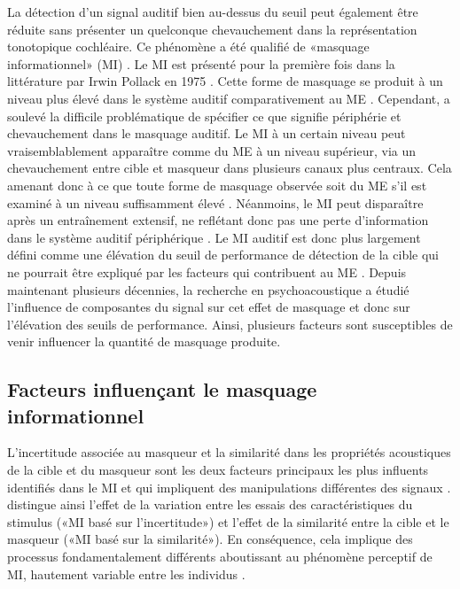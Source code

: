 La détection d'un signal auditif bien au-dessus du seuil peut également être réduite sans présenter un quelconque chevauchement dans la représentation tonotopique cochléaire. 
Ce phénomène a été qualifié de «masquage informationnel» (MI) \citep{durlach2003note, kidd2008informationalreview, pollack1975auditory, watson1976factors}. 
Le MI est présenté pour la première fois dans la littérature par Irwin Pollack en 1975 \citep{pollack1975auditory}. 
Cette forme de masquage se produit à un niveau plus élevé dans le système auditif comparativement au ME \citep{lutfi1989informational, leek1991informational, pollack1975auditory, watson1981role}. 
Cependant, \cite{durlach2006auditory} a soulevé la difficile problématique de spécifier ce que signifie périphérie et chevauchement dans le masquage auditif.
Le MI à un certain niveau peut vraisemblablement apparaître comme du ME à un niveau supérieur, via un chevauchement entre cible et masqueur dans plusieurs canaux plus centraux. 
Cela amenant donc à ce que toute forme de masquage observée soit du ME s'il est examiné à un niveau suffisamment élevé \citep{durlach2006auditory}. 
Néanmoins, le MI peut disparaître après un entraînement extensif, ne reflétant donc pas une perte d'information dans le système auditif périphérique \citep{oxenham2003informational}.
Le MI auditif est donc plus largement défini comme une élévation du seuil de performance de détection de la cible qui ne pourrait être expliqué par les facteurs qui contribuent au ME \citep{kidd2008informationalreview}. 
Depuis maintenant plusieurs décennies, la recherche en psychoacoustique a étudié l'influence de composantes du signal sur cet effet de masquage et donc sur l'élévation des seuils de performance. 
Ainsi, plusieurs facteurs sont susceptibles de venir influencer la quantité de masquage produite. 

\subsection{Facteurs influençant le masquage informationnel}
\label{facteursmasquage}

L'incertitude associée au masqueur et la similarité dans les propriétés acoustiques de la cible et du masqueur sont les deux facteurs principaux les plus influents identifiés dans le MI et qui impliquent des manipulations différentes des signaux \citep{durlach2003informational, kidd2008informationalreview, neff1987masking, watson2005some}. 
\cite{watson2005some} distingue ainsi l'effet de la variation entre les essais des caractéristiques du stimulus («MI basé sur l'incertitude») et l'effet de la similarité entre la cible et le masqueur («MI basé sur la similarité»). 
En conséquence, cela implique des processus fondamentalement différents aboutissant au phénomène perceptif de MI, hautement variable entre les individus \citep{oxenham2003informational}. 

